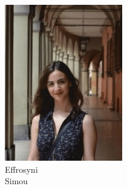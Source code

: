 \documentclass[aspectratio=169]{beamer}
\begin{document}
\begin{frame}
\begin{figure}
\begin{subfigure}[b]{0.14\linewidth}
			\includegraphics[width=\linewidth]{picture_ersi}
			\caption*{Effrosyni\\Simou}
		\end{subfigure}
		\\
		\vspace{1em}
		\begin{subfigure}[b]{0.14\linewidth}

\end{subfigure}
\end{figure}
\end{frame}
\end{document}
